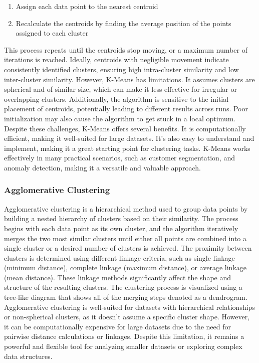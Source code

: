 \documentclass[11pt]{article}
\begin{document}
\begin{enumerate}
	\item Assign each data point to the nearest centroid

	\item Recalculate the centroids by finding the average position of the points assigned to each cluster

\end{enumerate}
\vspace{1\baselineskip}
This process repeats until the centroids stop moving, or a maximum number of iterations is reached. Ideally, centroids with negligible movement indicate consistently identified clusters, ensuring high intra-cluster similarity and low inter-cluster similarity. However, K-Means has limitations. It assumes clusters are spherical and of similar size, which can make it less effective for irregular or overlapping clusters. Additionally, the algorithm is sensitive to the initial placement of centroids, potentially leading to different results across runs. Poor initialization may also cause the algorithm to get stuck in a local optimum. Despite these challenges, K-Means offers several benefits. It is computationally efficient, making it well-suited for large datasets. It’s also easy to understand and implement, making it a great starting point for clustering tasks. K-Means works effectively in many practical scenarios, such as customer segmentation, and anomaly detection, making it a versatile and valuable approach.

\vspace{1\baselineskip}
\subsubsection{Agglomerative Clustering}

Agglomerative clustering is a hierarchical method used to group data points by building a nested hierarchy of clusters based on their similarity. The process begins with each data point as its own cluster, and the algorithm iteratively merges the two most similar clusters until either all points are combined into a single cluster or a desired number of clusters is achieved. The proximity between clusters is determined using different linkage criteria, such as single linkage (minimum distance), complete linkage (maximum distance), or average linkage (mean distance). These linkage methods significantly affect the shape and structure of the resulting clusters. The clustering process is visualized using a tree-like diagram that shows all of the merging steps denoted as a dendrogram. Agglomerative clustering is well-suited for datasets with hierarchical relationships or non-spherical clusters, as it doesn’t assume a specific cluster shape. However, it can be computationally expensive for large datasets due to the need for pairwise distance calculations or linkages. Despite this limitation, it remains a powerful and flexible tool for analyzing smaller datasets or exploring complex data structures.
\end{document}
